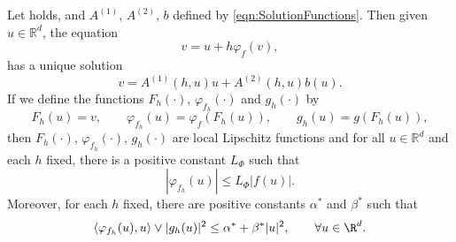 %
\begin{lem}\label{lem:PhiFhProp}
	Let  holds, and $A^{(1)}$, $A^{(2)}$, $b$  
	defined by 
	\eqref{eqn:SolutionFunctions}. Then given $u\in\mathbb{R}^d$, the equation
	\begin{equation}\label{eqn:varphiEquation}
		v = u + h \varphi_f(v),
	\end{equation}
	has a unique solution 
	\begin{equation}\label{eqn:varphiEqnSolution}
		v = A^{(1)}(h,u)u +A^{(2)}(h,u) b(u)	.
	\end{equation}
%
	If we define the functions
	$F_h(\cdot)$, $\varphi_{f_h}(\cdot)$ and $g_h(\cdot)$ by
	\begin{equation}\label{eqn:FunctionshDefinition}
		F_h(u) = v,
			\qquad 
			\varphi_{f_h}(u) =\varphi_{f}(F_h(u)),
			\qquad
			g_h(u) = g(F_h(u)),
	\end{equation}
	then $F_h(\cdot)$, $\varphi_{f_h}(\cdot)$, $g_h(\cdot)$ are local Lipschitz functions 
	and for all $u\in \mathbb{R}^d$ and each $h$ fixed, there is a positive constant $L_{\Phi}$ such that
	\begin{equation}\label{eqn:PhifhFbound}
		|\varphi_{f_h}(u)|\leq L_{\Phi} |f(u)|. 
	\end{equation} 
	Moreover, for each $h$ fixed,
	 there are positive constants $\alpha^*$ and  $\beta^*$ such that
	\begin{equation}\label{eqn:h-MonotoneCondition}
		\innerprod{\varphi_{f_h}(u)}{u} \vee |g_h(u)|^2 \leq \alpha^* + \beta^* |u|^2, 
		\qquad
		\forall u \in \R^d.
	\end{equation}
\end{lem}
%
